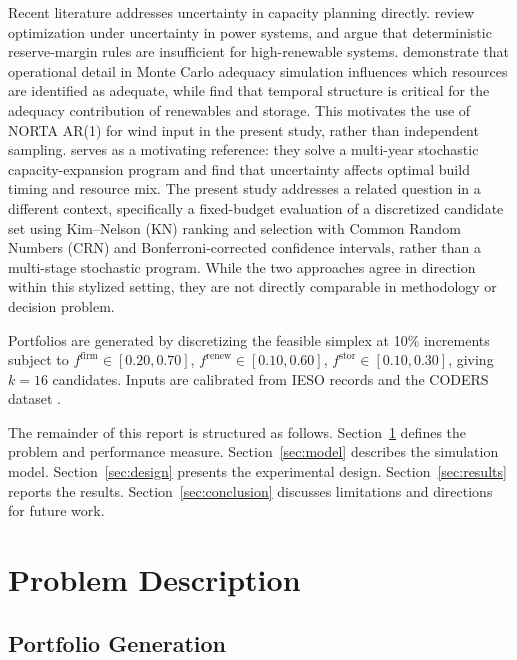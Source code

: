 \documentclass[11pt]{article}
\begin{document}
Recent literature addresses uncertainty in capacity planning directly.\citet{Roald2023} review optimization under uncertainty in power systems, and \citet{Stover2023} argue that deterministic reserve-margin rules are insufficient for high-renewable systems.\citet{Leibowicz2024} demonstrate that operational detail in Monte Carlo adequacy simulation influences which resources are identified as adequate, while \citet{Wang2024} find that temporal structure is critical for the adequacy contribution of renewables and storage. This motivates the use of NORTA AR(1) for wind input in the present study, rather than independent sampling.\citet{ParkBaldick2016} serves as a motivating reference: they solve a multi-year stochastic capacity-expansion program and find that uncertainty affects optimal build timing and resource mix. The present study addresses a related question in a different context, specifically a fixed-budget evaluation of a discretized candidate set using Kim--Nelson (KN) ranking and selection \citep{KimNelson2001} with Common Random Numbers (CRN) and Bonferroni-corrected confidence intervals, rather than a multi-stage stochastic program. While the two approaches agree in direction within this stylized setting, they are not directly comparable in methodology or decision problem.

Portfolios are generated by discretizing the feasible simplex at 10\% increments subject to $f^{\text{firm}} \in [0.20, 0.70]$, $f^{\text{renew}} \in [0.10, 0.60]$, $f^{\text{stor}} \in [0.10, 0.30]$, giving $k = 16$ candidates. Inputs are calibrated from IESO records and the CODERS dataset \citep{CODERS2025}.

The remainder of this report is structured as follows. Section~\ref{sec:problem} defines the problem and performance measure. Section~\ref{sec:model} describes the simulation model. Section~\ref{sec:design} presents the experimental design. Section~\ref{sec:results} reports the results. Section~\ref{sec:conclusion} discusses limitations and directions for future work.

\section{Problem Description}\label{sec:problem}

\subsection{Portfolio Generation}
\end{document}
